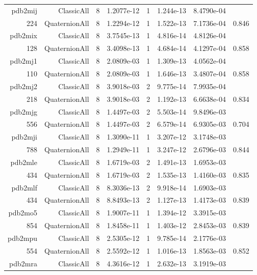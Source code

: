\begin{xltabular}{\textwidth}{r|rcS[table-format=1.4e+2]cS[table-format=1.3e+2]S[table-format=1.4e+2]S[table-format=-1.3]}
pdb2mij & ClassicAll & 8 & 1.2077e-12 & 1 & 1.244e-13 & 8.4790e-04 & \\
224 & QuaternionAll & 8 & 1.2294e-12 & 1 & 1.522e-13 & 7.1736e-04 & 0.846\\  \addlinespace
pdb2mix & ClassicAll & 8 & 3.7545e-13 & 1 & 4.816e-14 & 4.8126e-04 & \\
128 & QuaternionAll & 8 & 3.4098e-13 & 1 & 4.684e-14 & 4.1297e-04 & 0.858\\  \addlinespace
pdb2mj1 & ClassicAll & 8 & 2.0809e-03 & 1 & 1.309e-13 & 4.0562e-04 & \\
110 & QuaternionAll & 8 & 2.0809e-03 & 1 & 1.646e-13 & 3.4807e-04 & 0.858\\  \addlinespace
pdb2mj2 & ClassicAll & 8 & 3.9018e-03 & 2 & 9.775e-14 & 7.9935e-04 & \\
218 & QuaternionAll & 8 & 3.9018e-03 & 2 & 1.192e-13 & 6.6638e-04 & 0.834\\  \addlinespace
pdb2mjg & ClassicAll & 8 & 1.4497e-03 & 2 & 5.503e-14 & 9.8496e-03 & \\
556 & QuaternionAll & 8 & 1.4497e-03 & 2 & 6.579e-14 & 6.9305e-03 & 0.704\\  \addlinespace
pdb2mji & ClassicAll & 8 & 1.3090e-11 & 1 & 3.207e-12 & 3.1748e-03 & \\
788 & QuaternionAll & 8 & 1.2949e-11 & 1 & 3.247e-12 & 2.6796e-03 & 0.844\\  \addlinespace
pdb2mle & ClassicAll & 8 & 1.6719e-03 & 2 & 1.491e-13 & 1.6953e-03 & \\
434 & QuaternionAll & 8 & 1.6719e-03 & 2 & 1.535e-13 & 1.4160e-03 & 0.835\\  \addlinespace
pdb2mlf & ClassicAll & 8 & 8.3036e-13 & 2 & 9.918e-14 & 1.6903e-03 & \\
434 & QuaternionAll & 8 & 8.8493e-13 & 2 & 1.127e-13 & 1.4173e-03 & 0.839\\  \addlinespace
pdb2mo5 & ClassicAll & 8 & 1.9007e-11 & 1 & 1.394e-12 & 3.3915e-03 & \\
854 & QuaternionAll & 8 & 1.8458e-11 & 1 & 1.403e-12 & 2.8453e-03 & 0.839\\  \addlinespace
pdb2mpu & ClassicAll & 8 & 2.5305e-12 & 1 & 9.785e-14 & 2.1776e-03 & \\
554 & QuaternionAll & 8 & 2.5592e-12 & 1 & 1.016e-13 & 1.8563e-03 & 0.852\\  \addlinespace
pdb2mra & ClassicAll & 8 & 4.3616e-12 & 1 & 2.632e-13 & 3.1919e-03 & \\

\end{xltabular}
